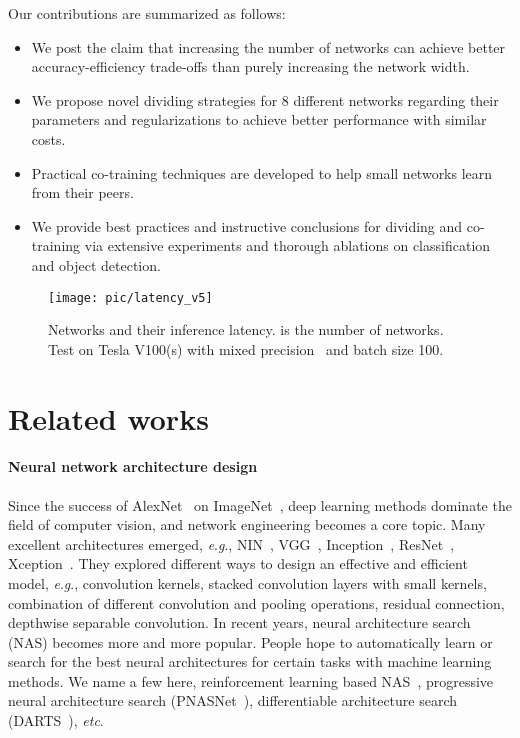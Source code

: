 \documentclass[lettersize,journal]{IEEEtran}
\newcommand{\eg}{\textit{e}.\textit{g}.}
\def\etc{\emph{etc}}
\begin{document}
Our contributions are summarized as follows:
\begin{itemize}
	\item We post the claim that increasing the number of networks can achieve better
		accuracy-efficiency trade-offs than purely increasing the network width.
	\item We propose novel dividing strategies for 8 different networks regarding their
		parameters and regularizations to achieve better performance with similar costs. 
	\item Practical co-training techniques are developed to help small networks learn from their peers.
	\item We provide best practices and instructive conclusions for dividing and co-training
		via extensive experiments and thorough ablations on classification and object detection.
\end{itemize}

\begin{figure}[tbp]
	\centering
\texttt{[image: pic/latency\_v5]}
	\caption{Networks and their inference latency.
		 is the number of networks.
		Test on Tesla V100(s) with
		mixed precision~\cite{2018_AMP} and batch size 100. }
	\label{latency}
\end{figure}

\section{Related works}
\noindent\paragraph*{Neural network architecture design}
Since the success of AlexNet~\cite{2012_conf/nips/KrizhevskySH12} on ImageNet~\cite{ImageNet},
deep learning methods dominate the field of computer vision, and
network engineering becomes a core topic.
Many excellent architectures emerged, \eg, NIN~\cite{lin2013network}, 
VGG~\cite{2014_VGGNet}, Inception~\cite{2015_SzegedyLJSRAEVR15}, 
ResNet~\cite{2016_ResNet}, Xception~\cite{2017_Xception}.
They explored different ways to design an effective and efficient model, \eg,
 convolution kernels,
stacked convolution layers with small kernels,
combination of different convolution and pooling operations,
residual connection,
depthwise separable convolution.
In recent years, neural architecture search (NAS) becomes more and more popular.
People hope to automatically learn or search for the best neural architectures
for certain tasks with machine learning methods.
We name a few here, 
reinforcement learning based NAS~\cite{2017_NAS},
progressive neural architecture search (PNASNet~\cite{2018_PNASNet}),
differentiable architecture search (DARTS~\cite{2019_ICLR_DARTS}), \etc.
\end{document}
